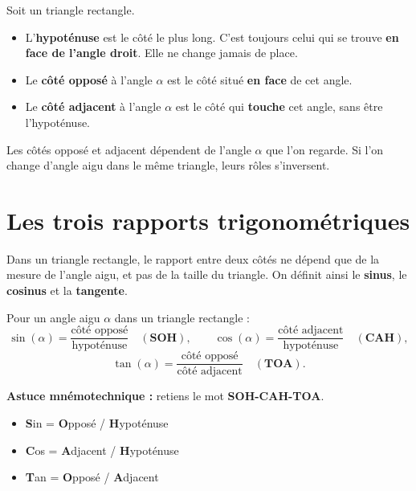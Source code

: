 \documentclass[../main.tex]{subfiles}
\begin{document}
\begin{definition}
Soit un triangle rectangle.
\begin{itemize}
  \item L'\textbf{hypoténuse} est le côté le plus long. C'est toujours celui qui se trouve \textbf{en face de l'angle droit}. Elle ne change jamais de place.
  \item Le \textbf{côté opposé} à l'angle $\alpha$ est le côté situé \textbf{en face} de cet angle.
  \item Le \textbf{côté adjacent} à l'angle $\alpha$ est le côté qui \textbf{touche} cet angle, sans être l'hypoténuse.
\end{itemize}
\end{definition}

\begin{attention}
Les côtés opposé et adjacent dépendent de l'angle $\alpha$ que l'on regarde. Si l'on change d'angle aigu dans le même triangle, leurs rôles s'inversent.
\end{attention}

\section{Les trois rapports trigonométriques}

Dans un triangle rectangle, le rapport entre deux côtés ne dépend que de la mesure de l'angle aigu, et pas de la taille du triangle. On définit ainsi le \textbf{sinus}, le \textbf{cosinus} et la \textbf{tangente}.

\begin{propriete}
Pour un angle aigu $\alpha$ dans un triangle rectangle :
\[
\sin(\alpha) = \frac{\text{côté opposé}}{\text{hypoténuse}} \quad (\textbf{SOH}), \qquad
\cos(\alpha) = \frac{\text{côté adjacent}}{\text{hypoténuse}} \quad (\textbf{CAH}),
\]
\[
\tan(\alpha) = \frac{\text{côté opposé}}{\text{côté adjacent}} \quad (\textbf{TOA}).
\]
\end{propriete}

\textbf{Astuce mnémotechnique :} retiens le mot \textbf{SOH-CAH-TOA}.
\begin{itemize}
  \item \textbf{S}in = \textbf{O}pposé / \textbf{H}ypoténuse
  \item \textbf{C}os = \textbf{A}djacent / \textbf{H}ypoténuse
  \item \textbf{T}an = \textbf{O}pposé / \textbf{A}djacent
\end{itemize}
\end{document}
